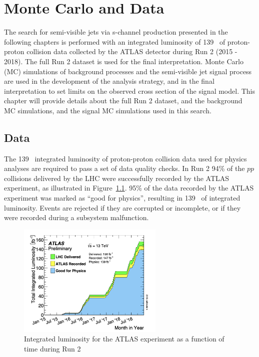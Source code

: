 \chapter{Monte Carlo and Data}
\label{ch:mc_data}

The search for semi-visible jets via s-channel production presented in the following chapters is performed with an integrated luminosity of 139 \fb~of proton-proton collision data collected by the ATLAS detector during Run 2 (2015 - 2018). The full Run 2 dataset is used for the final interpretation. Monte Carlo (MC) simulations of background processes and the semi-visible jet signal process are used in the development of the analysis strategy, and in the final interpretation to set limits on the observed cross section of the signal model. This chapter will provide details about the full Run 2 dataset, and the background MC simulations, and the signal MC simulations used in this search. 

\section{Data}
The 139 \fb~integrated luminosity of proton-proton collision data used for physics analyses are required to pass a set of data quality checks. In Run 2 94\% of the $pp$ collisions delivered by the LHC were successfully recorded by the ATLAS experiment, as illustrated in Figure~\ref{fig:atlas_grl}. 95\% of the data recorded by the ATLAS experiment was marked as ``good for physics'', resulting in 139 \fb~of integrated luminosity. Events are rejected if they are corrupted or incomplete, or if they were recorded during a subsystem malfunction. 

\begin{figure}
        \centering
	\includegraphics[width=0.62\textwidth]{figures/ch6/atlas_grl}
	\caption{Integrated luminosity for the ATLAS experiment as a function of time during Run 2 \cite{atlas_grl}
	\label{fig:atlas_grl}}
\end{figure}

